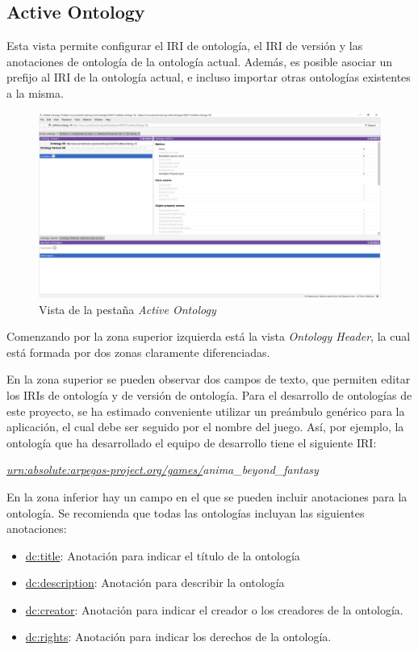 \subsection{Active Ontology}
Esta vista permite configurar el IRI de ontología, el IRI de versión y las anotaciones de ontología de la 
ontología actual. Además, es posible asociar un prefijo al IRI de la ontología actual, e incluso importar otras 
ontologías existentes a la misma.\medskip

\begin{figure}[H]
    \centering
    \includegraphics[scale=0.2]{Figures/Protege/Active_Ontology_view.png}
    \caption{Vista de la pestaña \textit{Active Ontology}}
    \label{Active_ontology_view}
\end{figure}

Comenzando por la zona superior izquierda está la vista \textit{Ontology Header}, la cual está formada 
por dos zonas claramente diferenciadas.\medskip

En la zona superior se pueden observar dos campos de texto, que permiten editar los IRIs de ontología y de versión
de ontología. Para el desarrollo de ontologías de este proyecto, se ha estimado conveniente utilizar un preámbulo genérico para 
la aplicación, el cual debe ser seguido por el nombre del juego. Así, por ejemplo, la ontología que ha desarrollado el equipo 
de desarrollo tiene el siguiente IRI: \medskip

\textit{\underline{urn:absolute:arpegos-project.org/games/}anima\_beyond\_fantasy}\medskip

En la zona inferior hay un campo en el que se pueden incluir anotaciones para la ontología. Se recomienda que todas las ontologías 
incluyan las siguientes anotaciones:

\begin{itemize}
    \item \underline{dc:title}: Anotación para indicar el título de la ontología
    \item \underline{dc:description}: Anotación para describir la ontología
    \item \underline{dc:creator}: Anotación para indicar el creador o los creadores de la ontología.
    \item \underline{dc:rights}: Anotación para indicar los derechos de la ontología.
\end{itemize}

